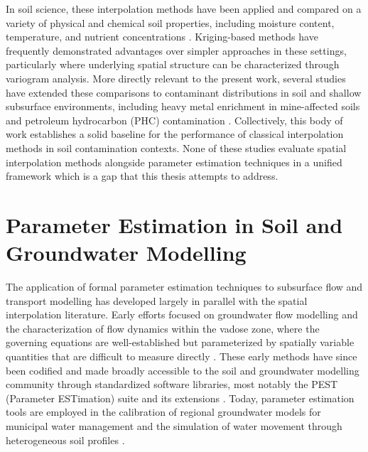 In soil science, these interpolation methods have been applied and compared on a variety of physical and chemical soil properties, including moisture content, temperature, and nutrient concentrations \cite{spatInt_drought, spatInt_soilProp}. Kriging-based methods have frequently demonstrated advantages over simpler approaches in these settings, particularly where underlying spatial structure can be characterized through variogram analysis. More directly relevant to the present work, several studies have extended these comparisons to contaminant distributions in soil and shallow subsurface environments, including heavy metal enrichment in mine-affected soils and petroleum hydrocarbon (PHC) contamination \cite{spatInt_mines, spatInt_PHC}. Collectively, this body of work establishes a solid baseline for the performance of classical interpolation methods in soil contamination contexts. None of these studies evaluate spatial interpolation methods alongside parameter estimation techniques in a unified framework which is a gap that this thesis attempts to address. 

\section{Parameter Estimation in Soil and Groundwater Modelling}
\label{sec:param_est_soil_groundwater}

The application of formal parameter estimation techniques to subsurface flow and transport modelling has developed largely in parallel with the spatial interpolation literature. Early efforts focused on groundwater flow modelling and the characterization of flow dynamics within the vadose zone, where the governing equations are well-established but parameterized by spatially variable quantities that are difficult to measure directly \cite{parEst_first}. These early methods have since been codified and made broadly accessible to the soil and groundwater modelling community through standardized software libraries, most notably the PEST (Parameter ESTimation) suite and its extensions \cite{pestManual}. Today, parameter estimation tools are employed in the calibration of regional groundwater models for municipal water management and the simulation of water movement through heterogeneous soil profiles \cite{parEst_ex1, parEst_ex2}.

